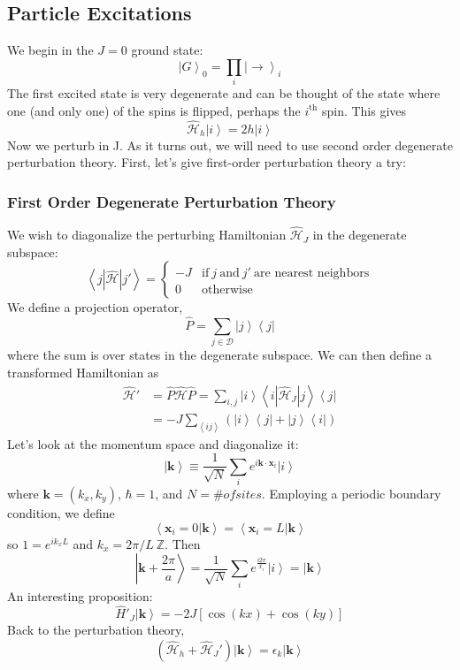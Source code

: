 \documentclass{article}
\begin{document}
	\subsection{Particle Excitations} We begin in the $J=0$ ground state:
	$$\left|G\right>_0=\prod_i\left|\rightarrow\right>_i$$
	The first excited state is very degenerate and can be thought of the state where one (and only one) of the spins is flipped, perhaps the $i^{\mathrm{th}}$ spin. This gives
	$$\hat{\mathcal{H}}_h\left|i\right>=2h\left|i\right>$$
	Now we perturb in J. As it turns out, we will need to use second order degenerate perturbation theory. First, let's give first-order perturbation theory a try:
	\subsubsection{First Order Degenerate Perturbation Theory}
	We wish to diagonalize the perturbing Hamiltonian $\hat{\mathcal{H}}_J$ in the degenerate subspace:
	$$\left<j\left|\hat{\mathcal{H}}\right|j'\right>=
	\begin{cases}
	-J & \mathrm{if}\ j\ \mathrm{and}\ j'\ \textrm{are nearest neighbors}\\
	0 & \textrm{otherwise}
	\end{cases}$$	
	We define a projection operator,
	$$\hat{P}=\sum_{j\in\mathcal{D}} \left|j\right>\left<j\right|$$
	where the sum is over states in the degenerate subspace. We can then define a transformed Hamiltonian as
	\begin{align*}
		\hat{\mathcal{H}}'&=\hat{P}\hat{\mathcal{H}}\hat{P}=\sum_{i,j}\left|i\right>\left<i\left|\hat{\mathcal{H}}_J\right|j\right>\left<j\right|\\
		&=-J\sum_{\left<ij\right>}\left(\left|i\right>\left<j\right|+\left|j\right>\left<i\right|\right)
	\end{align*}
	Let's look at the momentum space and diagonalize it:
	$$\left|\mathbf{k}\right>\equiv\frac{1}{\sqrt{N}}\sum_ie^{i\mathbf{k}\cdot\mathbf{x}_i}\left|i\right>$$
	where $\mathbf{k}=(k_x,k_y)$, $\hbar=1$, and $N=\# of sites$. Employing a periodic boundary condition, we define
	$$\left<\mathbf{x}_i=0|\mathbf{k}\right>=\left<\mathbf{x}_i=L|\mathbf{k}\right>$$
	so $1=e^{ik_xL}$ and $k_x=2\pi/L\ \mathbb{Z}$. Then 
	$$\left|\mathbf{k}+\frac{2\pi}{a}\right>=\frac{1}{\sqrt{N}}\sum_i e^{\frac{i2\pi}{x_i}}\left|i\right>=\left|\mathbf{k}\right>$$
	An interesting proposition:
	$$\hat{H}'_J\left|\mathbf{k}\right>=-2J\left[\cos(kx)+\cos(ky)\right]$$
	Back to the perturbation theory, 
	$$(\hat{\mathcal{H}}_h+\hat{\mathcal{H}}_J')\left|\mathbf{k}\right>=\epsilon_k\left|\mathbf{k}\right>$$
\end{document}
